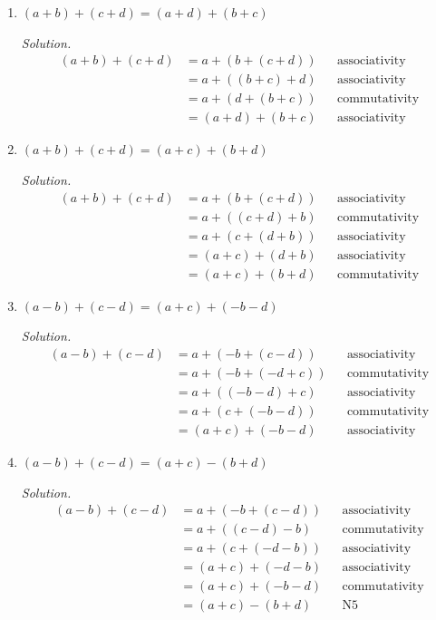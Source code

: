 \documentclass[11pt]{article}
\begin{document}
\begin{enumerate}
  \item $(a + b) + (c + d) = (a + d) + (b + c)$

    \emph{Solution.}
    \begin{align*}
      (a + b) + (c + d)
        &= a + (b + (c + d)) && \text{associativity} \\
        &= a + ((b + c) + d) && \text{associativity} \\
        &= a + (d + (b + c)) && \text{commutativity} \\
        &= (a + d) + (b + c) && \text{associativity}
    \end{align*}

  \item $(a + b) + (c + d) = (a + c) + (b + d)$

    \emph{Solution.}
    \begin{align*}
      (a + b) + (c + d)
        &= a + (b + (c + d)) && \text{associativity} \\
        &= a + ((c + d) + b) && \text{commutativity} \\
        &= a + (c + (d + b)) && \text{associativity} \\
        &= (a + c) + (d + b) && \text{associativity} \\
        &= (a + c) + (b + d) && \text{commutativity}
    \end{align*}

  \item $(a - b) + (c - d) = (a + c) + (-b - d)$

    \emph{Solution.}
    \begin{align*}
      (a - b) + (c - d)
        &= a + (-b + (c - d)) && \text{associativity} \\
        &= a + (-b + (-d + c)) && \text{commutativity} \\
        &= a + ((-b - d) + c) && \text{associativity} \\
        &= a + (c + (-b - d)) && \text{commutativity} \\
        &= (a + c) + (-b - d) && \text{associativity}
    \end{align*}

  \item $(a - b) + (c - d) = (a + c) - (b + d)$

    \emph{Solution.}
    \begin{align*}
      (a - b) + (c - d)
        &= a + (-b + (c - d)) && \text{associativity} \\
        &= a + ((c - d) - b) && \text{commutativity} \\
        &= a + (c + (-d - b)) && \text{associativity} \\
        &= (a + c) + (-d - b) && \text{associativity} \\
        &= (a + c) + (-b - d) && \text{commutativity} \\
        &= (a + c) - (b + d) && \text{N5}
    \end{align*}


\end{enumerate}
\end{document}
